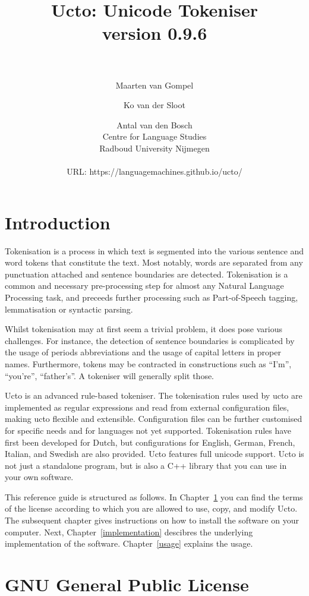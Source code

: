 \documentclass[a4paper,12pt]{report}
\author{Maarten van Gompel \and Ko van der Sloot \and Antal van den Bosch \\
        Centre for Language Studies \\
        Radboud University Nijmegen \\ \\  
        URL: https://languagemachines.github.io/ucto/}
\title{{\huge Ucto: Unicode Tokeniser} \\ \vspace*{0.5cm}
{\bf version 0.9.6} \\ \vspace*{0.5cm}{\huge Reference Guide}\\
\vspace*{1cm}} %
\begin{document}

\maketitle

\tableofcontents

\chapter*{Introduction}

Tokenisation is a process in which text is segmented into the various sentence and word tokens that constitute the text. Most notably, words are separated from any punctuation attached and sentence boundaries are detected. Tokenisation is a common and necessary pre-processing step for almost any Natural Language Processing task, and preceeds further processing such as Part-of-Speech tagging, lemmatisation or syntactic parsing. 

Whilst tokenisation may at first seem a trivial problem, it does pose various challenges. For instance, the detection of sentence boundaries is complicated by the usage of periods abbreviations and the usage of capital letters in proper names. Furthermore, tokens may be contracted in constructions such as ``I'm'', ``you're'', ``father's''. A tokeniser will generally split those.

Ucto is an advanced rule-based tokeniser. The tokenisation rules used by ucto are implemented as regular expressions and read from external configuration files, making ucto flexible and extensible. Configuration files can be further customised for specific needs and for languages not yet supported. Tokenisation rules have first been developed for Dutch, but configurations for English, German, French, Italian, and Swedish are also provided. Ucto features full unicode support. Ucto is not just a standalone program, but is also a C++ library that you can use in your own software. 

This reference guide is structured as follows. In Chapter~\ref{license} you can find the terms of the license according to which you are allowed to use, copy, and modify Ucto. The subsequent chapter gives instructions on how to install the software on your computer.  Next, Chapter~\ref{implementation} descibres the underlying implementation of the software. Chapter~\ref{usage} explains the usage.  

\chapter{GNU General Public License}
\label{license}
\end{document}
